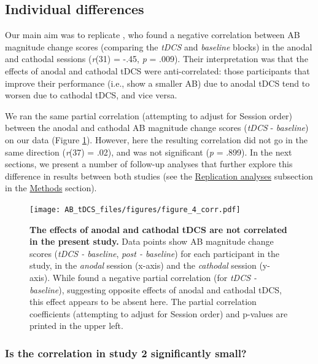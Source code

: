 \documentclass[11pt,]{memoir}
\begin{document}
\hypertarget{individual-differences}{%
\subsection{Individual differences}\label{individual-differences}}

Our main aim was to replicate \textcite{London2015}, who found a negative correlation between AB magnitude change scores (comparing the \emph{tDCS} and \emph{baseline} blocks) in the anodal and cathodal sessions (\emph{r}(31) = -.45, \emph{p} = .009). Their interpretation was that the effects of anodal and cathodal tDCS were anti-correlated: those participants that improve their performance (i.e., show a smaller AB) due to anodal tDCS tend to worsen due to cathodal tDCS, and vice versa.

We ran the same partial correlation (attempting to adjust for Session order) between the anodal and cathodal AB magnitude change scores (\emph{tDCS} - \emph{baseline}) on our data (Figure \ref{fig:fig-corr}). However, here the resulting correlation did not go in the same direction (\emph{r}(37) = .02), and was not significant (\emph{p} = .899). In the next sections, we present a number of follow-up analyses that further explore this difference in results between both studies (see the \protect\hyperlink{AB_tDCS-rep-analyses}{Replication analyses} subsection in the \protect\hyperlink{AB_tDCS-methods}{Methods} section).

\begin{figure}
\centering
\texttt{[image: AB\_tDCS\_files/figures/figure\_4\_corr.pdf]}
\caption{\label{fig:fig-corr}\textbf{The effects of anodal and cathodal tDCS are not correlated in the present study.} Data points show AB magnitude change scores (\emph{tDCS - baseline}, \emph{post - baseline}) for each participant in the study, in the \emph{anodal} session (x-axis) and the \emph{cathodal} session (y-axis). While \textcite{London2015} found a negative partial correlation (for \emph{tDCS - baseline}), suggesting opposite effects of anodal and cathodal tDCS, this effect appears to be absent here. The partial correlation coefficients (attempting to adjust for Session order) and p-values are printed in the upper left.}
\end{figure}



\hypertarget{is-the-correlation-in-study-2-significantly-small}{%
\subsubsection{Is the correlation in study 2 significantly small?}\label{is-the-correlation-in-study-2-significantly-small}}
\end{document}
